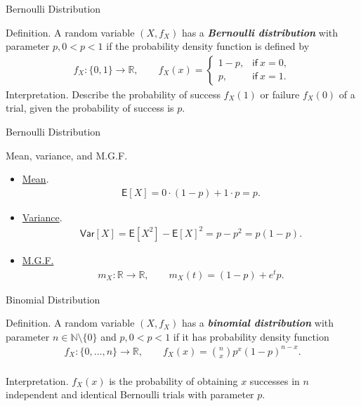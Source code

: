 \documentclass[hyperref={pdfpagelabels=false}]{beamer}
\newcommand{\R}{\mathbb{R}}
\newcommand{\N}{\mathbb{N}}
\newcommand{\U}{\mathsf}
\newcommand{\highlightg}[1]{\textcolor[rgb]{0.1,0.5,0.3}{\emph{\textbf{#1}}}}
\newcommand{\structb}[1]{\textcolor[rgb]{0.2,0.2,0.7}{#1}}
\begin{document}
\begin{frame}{Bernoulli Distribution}

\justifying
\structb{Definition.} A random variable $(X, f_X)$ has a \highlightg{Bernoulli distribution} with parameter $p, 0 < p < 1$ if the probability density function is defined by
\begin{align*}
f_X: \{0, 1\} \rightarrow \R, \qquad f_X(x) = \left\{
\begin{array}{ll}
1-p, & \U{if\ } x = 0, \\
p, & \U{if\ } x = 1.
\end{array}
\right.
\end{align*}
\structb{Interpretation.} Describe the probability of success $f_X(1)$ or failure $f_X(0)$ of a trial, given the probability of success is $p$.

\end{frame}

\begin{frame}{Bernoulli Distribution}

\justifying
\structb{Mean, variance, and M.G.F.}
\begin{itemize}
	\justifying
	\item \underline{Mean}.
	\begin{align*}
	\U{E}[X] = 0\cdot (1-p) + 1\cdot p = p.
	\end{align*}
	\item \underline{Variance}.
	\begin{align*}
	\U{Var}[X] = \U{E}[X^2] - \U{E}[X]^2 = p - p^2 = p(1-p).
	\end{align*}
	\item \underline{M.G.F.}
	\begin{align*}
	m_X: \R\rightarrow \R, \qquad m_X(t) = (1-p) + e^tp.
	\end{align*}
\end{itemize}

\end{frame}

\begin{frame}{Binomial Distribution}

\justifying
\structb{Definition.} A random variable $(X, f_X)$ has a \highlightg{binomial distribution} with parameter $n\in \N\setminus\{0\}$ and $p, 0 < p < 1$ if it has probability density function
\begin{align*}
f_X: \{0, \ldots, n\} \rightarrow \R, \qquad f_X(x) = \binom{n}{x} p^x(1-p)^{n-x}.
\end{align*}
~\\
\structb{Interpretation.} $f_X(x)$ is the probability of obtaining $x$ successes in $n$ independent and identical Bernoulli trials with parameter $p$.


\end{frame}
\end{document}
